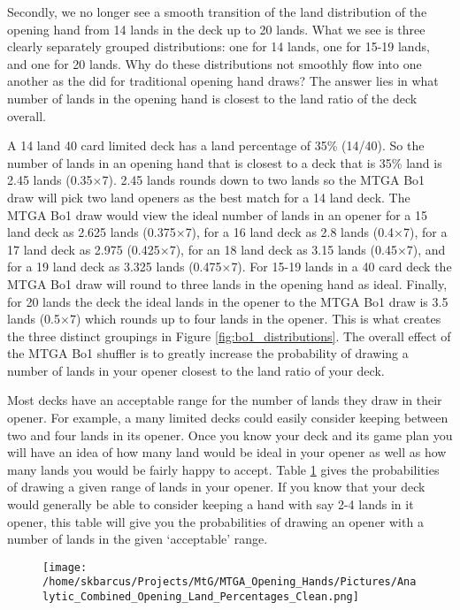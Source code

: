 \documentclass[oneside]{book}   %
\begin{document}
Secondly, we no longer see a smooth transition of the land distribution of the opening hand from 14 lands in the deck up to 20 lands. What we see is three clearly separately grouped distributions: one for 14 lands, one for 15-19 lands, and one for 20 lands. Why do these distributions not smoothly flow into one another as the did for traditional opening hand draws? The answer lies in what number of lands in the opening hand is closest to the land ratio of the deck overall. 

A 14 land 40 card limited deck has a land percentage of 35\% (14/40). So the number of lands in an opening hand that is closest to a deck that is 35\% land is 2.45 lands (0.35$\times$7). 2.45 lands rounds down to two lands so the MTGA Bo1 draw will pick two land openers as the best match for a 14 land deck. The MTGA Bo1 draw would view the ideal number of lands in an opener for a 15 land deck as 2.625 lands (0.375$\times$7), for a 16 land deck as 2.8 lands (0.4$\times$7), for a 17 land deck as 2.975 (0.425$\times$7), for an 18 land deck as 3.15 lands (0.45$\times$7), and for a 19 land deck as 3.325 lands (0.475$\times$7). For 15-19 lands in a 40 card deck the MTGA Bo1 draw will round to three lands in the opening hand as ideal. Finally, for 20 lands the deck the ideal lands in the opener to the MTGA Bo1 draw is 3.5 lands (0.5$\times$7) which rounds up to four lands in the opener. This is what creates the three distinct groupings in Figure \ref{fig:bo1_distributions}. The overall effect of the MTGA Bo1 shuffler is to greatly increase the probability of drawing a number of lands in your opener closest to the land ratio of your deck. 

Most decks have an acceptable range for the number of lands they draw in their opener. For example, a many limited decks could easily consider keeping between two and four lands in its opener. Once you know your deck and its game plan you will have an idea of how many land would be ideal in your opener as well as how many lands you would be fairly happy to accept. Table \ref{fig:combined} gives the probabilities of drawing a given range of lands in your opener. If you know that your deck would generally be able to consider keeping a hand with say 2-4 lands in it opener, this table will give you the probabilities of drawing an opener with a number of lands in the given `acceptable' range.

 	\begin{figure}[!ht]
	\centering
	\centerline{\texttt{[image: /home/skbarcus/Projects/MtG/MTGA\_Opening\_Hands/Pictures/Analytic\_Combined\_Opening\_Land\_Percentages\_Clean.png]}}
	\label{fig:combined}
	\end{figure}	
\end{document}
